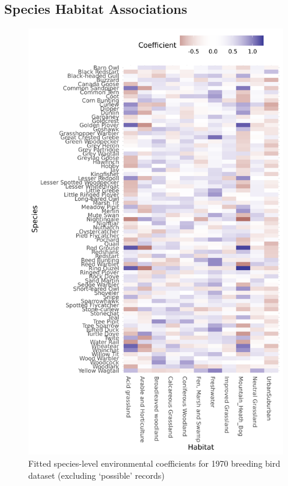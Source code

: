 \documentclass[
]{article}
\begin{document}
\hypertarget{species-habitat-associations}{%
\subsection{Species Habitat
Associations}\label{species-habitat-associations}}

\begin{figure}
\centering
\includegraphics[width=\textwidth,height=0.7\textheight]{BirdMarkdowns/BirdImages/BirdHabitat.png}
\caption{Fitted species-level environmental coefficients for 1970
breeding bird dataset (excluding `possible' records)}
\end{figure}
\end{document}

